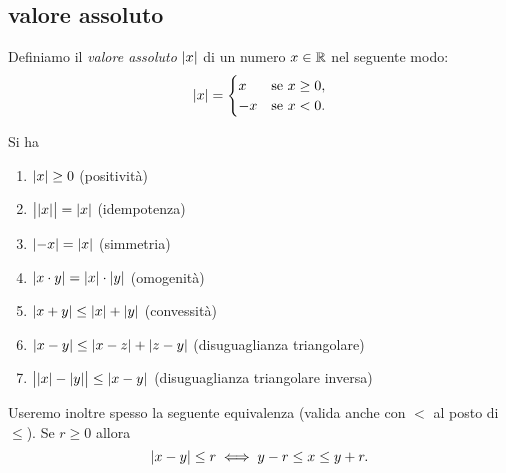 \subsection{valore assoluto}

\begin{definition}
\mymark{***}
Definiamo il \emph{valore assoluto}%
%
 ${\left|x\right|}$ di un numero $x\in {\mathbb R}$ nel seguente modo:
\[
{\left|x\right|} =
\begin{cases}
  x & \text{se $x\ge 0$}, \\
  -x & \text{se $x<0 $}.
\end{cases}
\]
\end{definition}
  
\begin{proposition}
\mymark{**}
Si ha
\begin{enumerate}
\item ${\left|x\right|}\ge 0$ (positività)
\item $\big\lvert{\left|x\right|}\big\rvert = {\left|x\right|}$ (idempotenza)
\item ${\left|-x\right|} = {\left|x\right|}$ (simmetria)
\item ${\left|x\cdot y\right|} = {\left|x\right|}\cdot {\left|y\right|}$ (omogenità)
\item ${\left|x+y\right|} \le {\left|x\right|} + {\left|y\right|}$ (convessità)
\item ${\left|x-y\right|} \le {\left|x-z\right|} + {\left|z-y\right|}$ (disuguaglianza triangolare)
\item $\big\lvert{\left|x\right|}-{\left|y\right|}\big\rvert \le {\left|x-y\right|}$ (disuguaglianza triangolare inversa)
\end{enumerate}
Useremo inoltre spesso la seguente equivalenza (valida
anche con $<$ al posto di $\le$). Se $r\ge 0$ allora
\[
  {\left|x-y\right|} \le r
  \iff
  y - r \le x \le y + r.
\]
\end{proposition}
%
